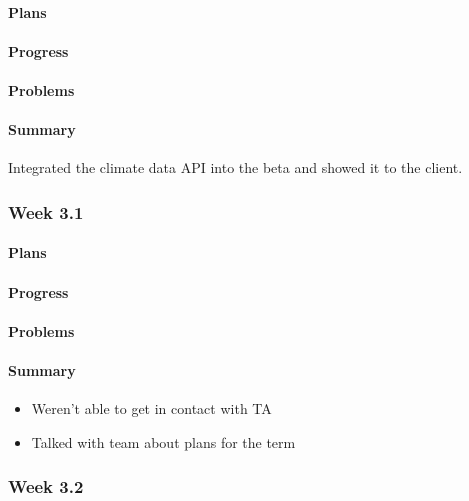 \documentclass[onecolumn, draftclsnofoot,10pt, compsoc]{article}
\begin{document}
			\paragraph{Plans} \hfill \break

			\paragraph{Progress} \hfill \break

			\paragraph{Problems} \hfill \break

			\paragraph{Summary} \hfill \break
			    Integrated the climate data API into the beta and showed it to the client.
		
		\subsubsection{Week 3.1}
		    \paragraph{Plans} \hfill \break

		    \paragraph{Progress} \hfill \break

		    \paragraph{Problems} \hfill \break
	
		    \paragraph{Summary} \hfill \break
				\begin{itemize}
                    \item Weren't able to get in contact with TA 
                    \item Talked with team about plans for the term 
                \end{itemize}
		    
        \subsubsection{Week 3.2}
\end{document}
